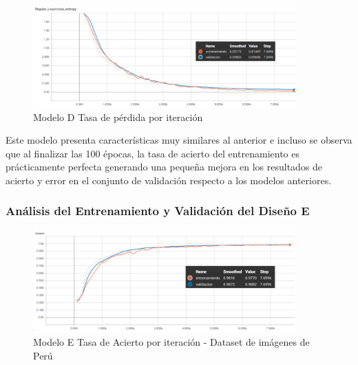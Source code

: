 			\begin{figure}[H]
				\begin{center}
				\includegraphics[width=0.9\textwidth]{images/desarrollo/trainResults/peru/modelDLoss} 
				\end{center}
				\begin{center}
				\caption{\small{Modelo D Tasa de pérdida por iteración}}
				
				{\small{\fontsize{10}{16.8}\selectfont {Fuente: Elaboración propia}}}
				\end{center}
				\vspace{-1.5em}
			\end{figure}

			Este modelo presenta características muy similares al anterior e incluso se observa que al finalizar las 100 épocas, la tasa de acierto del entrenamiento es prácticamente perfecta generando una pequeña mejora en los resultados de acierto y error en el conjunto de validación respecto a los modelos anteriores.
			

		\subsubsection{Análisis del Entrenamiento y Validación del Diseño E} 
			\begin{figure}[H]
				\begin{center}
				\includegraphics[width=0.9\textwidth]{images/desarrollo/trainResults/peru/modelEAcierto} 
				\end{center}
				\begin{center}
				\caption{\small{Modelo E Tasa de Acierto por iteración - Dataset de imágenes de Perú  }}
				
				{\small{\fontsize{10}{16.8}\selectfont {Fuente: Elaboración propia}}}
				\end{center}
				\vspace{-1.5em}
			\end{figure}
		
